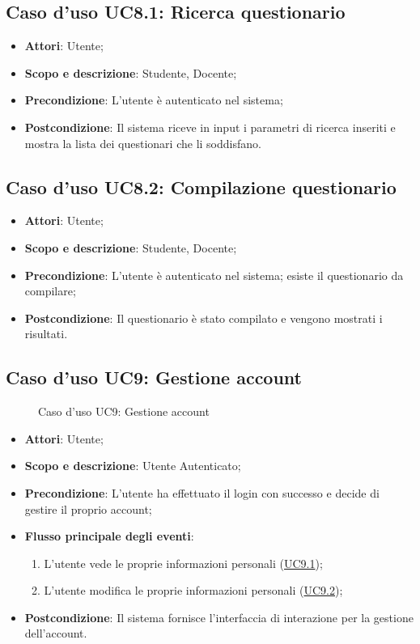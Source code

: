 \documentclass[12pt,a4paper]{article}
\begin{document}
\subsection{Caso d'uso UC8.1: Ricerca questionario}\begin{itemize}
	\item \textbf{Attori}: Utente;
	\item \textbf{Scopo e descrizione}: Studente, Docente; 
	\item \textbf{Precondizione}: L'utente è autenticato nel sistema;
	\item \textbf{Postcondizione}: Il sistema riceve in input i parametri di ricerca inseriti e mostra la lista dei questionari che li soddisfano.
\end{itemize}
\hypertarget{UC8.2}{}
\subsection{Caso d'uso UC8.2: Compilazione questionario}\begin{itemize}
	\item \textbf{Attori}: Utente;
	\item \textbf{Scopo e descrizione}: Studente, Docente; 
	\item \textbf{Precondizione}: L'utente è autenticato nel sistema; esiste il questionario da compilare;
	\item \textbf{Postcondizione}: Il questionario è stato compilato e vengono mostrati i risultati.
\end{itemize}
\hypertarget{UC9}{}
\subsection{Caso d'uso UC9: Gestione account}
\begin{figure}[H]
	\centering

	\caption{Caso d'uso UC9: Gestione account}\label{fig:UC9} 
\end{figure}\begin{itemize}
\item \textbf{Attori}: Utente;
\item \textbf{Scopo e descrizione}: Utente Autenticato; 
\item \textbf{Precondizione}: L’utente ha effettuato  il login con successo e decide di gestire il proprio account;

\item \textbf{Flusso principale degli eventi}:
\begin{enumerate}
	\item L’utente vede le proprie informazioni personali (\hyperlink{UC9.1}{UC9.1});
	\item L’utente modifica le proprie informazioni personali (\hyperlink{UC9.2}{UC9.2});
	
\end{enumerate}
\item \textbf{Postcondizione}:  Il sistema fornisce l’interfaccia di interazione per la gestione dell’account.
\end{itemize}
\hypertarget{UC9.1}{}
\end{document}
